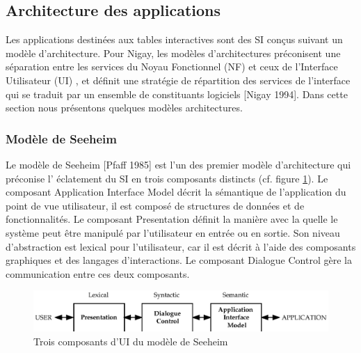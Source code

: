\subsection{Architecture des applications}
\label{sec:3}
Les applications destinées aux tables interactives sont des SI conçus suivant un modèle d'architecture. Pour Nigay, les modèles d'architectures préconisent une séparation entre les services du Noyau Fonctionnel (NF) et ceux de l'Interface Utilisateur (UI) , et définit une stratégie de répartition des services de l'interface qui se traduit par un ensemble de constituants logiciels [Nigay 1994].  Dans cette section nous présentons quelques modèles architectures.
\subsubsection{Modèle de Seeheim}
Le modèle de Seeheim [Pfaff 1985] est l'un des premier modèle d'architecture qui préconise l' éclatement du SI en trois composants distincts (cf. figure \ref{fig:7}). Le composant Application Interface Model décrit la sémantique de l'application du point de vue utilisateur, il est composé de structures de données et de fonctionnalités. Le composant Presentation définit la manière avec la quelle le système peut être manipulé par l'utilisateur en entrée ou en sortie. Son niveau d'abstraction est lexical pour l'utilisateur, car il est décrit à l'aide des composants graphiques et des langages d'interactions. Le composant Dialogue Control gère la communication entre ces deux composants.
\begin{figure}[ht]
\includegraphics[width=432pt]{chap2/img-8.eps}
\caption{Trois composants d'UI du modèle de Seeheim}\label{fig:7}
\end{figure}
